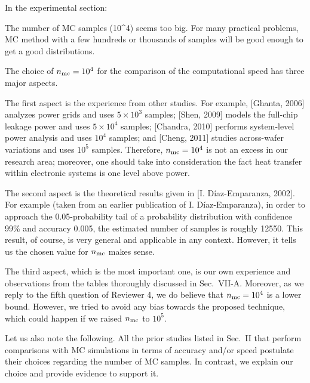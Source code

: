 \begin{reviewer}
In the experimental section:

The number of MC samples (10\^{}4) seems too big. For many practical problems, MC method with a few hundreds or thousands of samples will be good enough to get a good distributions.
\end{reviewer}
\begin{authors}
The choice of ${n_\text{mc}} = 10^4$ for the comparison of the computational speed has three major aspects.

The first aspect is the experience from other studies.
For example, [Ghanta, 2006] analyzes power grids and uses $5 \times 10^3$ samples; [Shen, 2009] models the full-chip leakage power and uses $5 \times 10^4$ samples; [Chandra, 2010] performs system-level power analysis and uses $10^4$ samples; and [Cheng, 2011] studies across-wafer variations and uses $10^5$ samples.
Therefore, ${n_\text{mc}} = 10^4$ is not an excess in our research area; moreover, one should take into consideration the fact heat transfer within electronic systems is one level above power.

The second aspect is the theoretical results given in [I. D\'{i}az-Emparanza, 2002].
For example (taken from an earlier publication of I. D\'{i}az-Emparanza), in order to approach the 0.05-probability tail of a probability distribution with confidence 99\% and accuracy 0.005, the estimated number of samples is roughly 12550.
This result, of course, is very general and applicable in any context.
However, it tells us the chosen value for ${n_\text{mc}}$ makes sense.

The third aspect, which is the most important one, is our own experience and observations from the tables thoroughly discussed in Sec.~VII-A.
Moreover, as we reply to the fifth question of Reviewer 4, we do believe that ${n_\text{mc}} = 10^4$ is a lower bound.
However, we tried to avoid any bias towards the proposed technique, which could happen if we raised ${n_\text{mc}}$ to $10^5$.

Let us also note the following.
All the prior studies listed in Sec.~II that perform comparisons with MC simulations in terms of accuracy and/or speed postulate their choices regarding the number of MC samples.
In contrast, we explain our choice and provide evidence to support it.
\end{authors}

